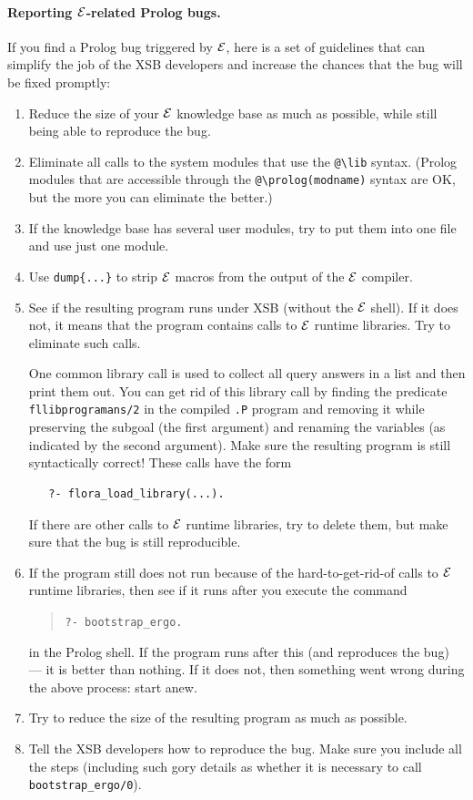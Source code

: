 \documentclass[11pt]{article}
\newcommand{\ERGO}{\mbox{\ensuremath{\cal{E}}\smaller{{\sc{RGO}}}}\xspace}
\newcommand{\FLSYSTEM}{\ERGO}
\newcommand{\FLBOOTSTRAP}{bootstrap\_ergo}
\newcommand{\bs}{\textbackslash}
\begin{document}
\paragraph{Reporting \FLSYSTEM-related Prolog bugs.}
If you find a Prolog bug triggered by \FLSYSTEM, here is a set of
guidelines that can simplify the job of the XSB developers and increase the
chances that the bug will be fixed promptly:
\begin{enumerate}
  \item  Reduce the size of your \FLSYSTEM knowledge base as much as possible, while
    still being able to reproduce the bug.
  \item  Eliminate all calls to the system modules that use the
    {\tt @\bs{}lib} syntax. (Prolog modules that are accessible
    through the {\tt @\bs{}prolog(modname)} syntax are OK, but the more you can
    eliminate the better.)
  \item If the knowledge base has several user modules, try to put them into one
    file and use just one module. 
  \item  Use {\tt dump\{...\}} to strip \FLSYSTEM macros from the output of the
    \FLSYSTEM compiler.
  \item  See if the resulting program runs under XSB (without
    the \FLSYSTEM shell). If it does not, it means that the program contains
    calls to \FLSYSTEM runtime libraries. Try to eliminate such calls.

    One common library call is used to collect all query answers in a list
    and then print them out. You can get rid of this library call by
    finding the predicate {\tt fllibprogramans/2} in the compiled {\tt .P}
    program and removing it while preserving the subgoal (the first
    argument) and renaming the variables (as indicated by the second argument).
    Make sure the resulting program is still syntactically correct!
    These calls have the form
    \begin{verbatim}
   ?- flora_load_library(...).      
    \end{verbatim}
    If there are other calls to \FLSYSTEM runtime libraries, try to delete
    them, but make sure that the bug is still reproducible.
  \item If the program still does not run because of the hard-to-get-rid-of
    calls to \FLSYSTEM runtime libraries, then see if it runs after you
    execute the command
    \begin{quote}
       {\tt ?- \FLBOOTSTRAP.}      
    \end{quote}
    in the Prolog shell. If the program runs after this (and reproduces the
    bug) --- it is better than nothing. If it does not, then something went
    wrong during the above process: start anew.
  \item Try to reduce the size of the resulting program as much as possible.
  \item Tell the XSB developers how to reproduce the bug. Make sure you
    include all the steps (including such gory details as whether it is
    necessary to call {\tt \FLBOOTSTRAP/0}).
\end{enumerate}
\end{document}

